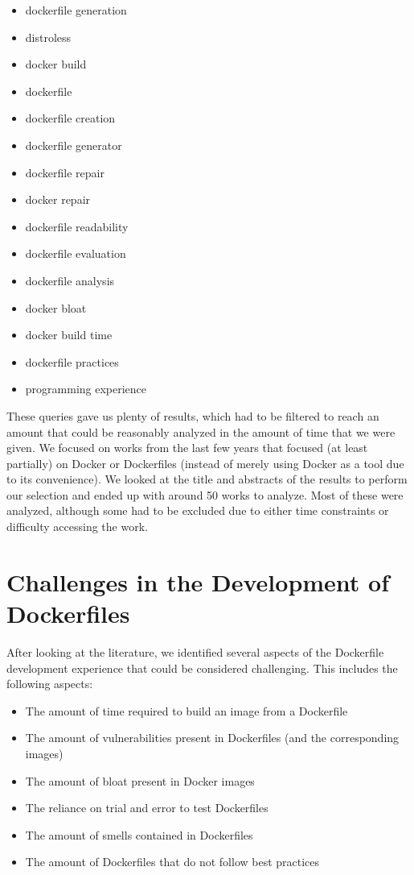 \begin{itemize}
    \item dockerfile generation
    \item distroless
    \item docker build
    \item dockerfile
    \item dockerfile creation
    \item dockerfile generator
    \item dockerfile repair
    \item docker repair
    \item dockerfile readability
    \item dockerfile evaluation
    \item dockerfile analysis
    \item docker bloat
    \item docker build time
    \item dockerfile practices
    \item programming experience
\end{itemize}

These queries gave us plenty of results, which had to be filtered to reach an amount that could be reasonably analyzed in the amount of time that we were given. We focused on works from the last few years that focused (at least partially) on Docker or Dockerfiles (instead of merely using Docker as a tool due to its convenience). We looked at the title and abstracts of the results to perform our selection and ended up with around 50 works to analyze. Most of these were analyzed, although some had to be excluded due to either time constraints or difficulty accessing the work. 

\section{Challenges in the Development of Dockerfiles} \label{sec:challenges_development_dockerfiles}

After looking at the literature, we identified several aspects of the Dockerfile development experience that could be considered challenging. This includes the following aspects:

\begin{itemize}
    \item The amount of time required to build an image from a Dockerfile
    \item The amount of vulnerabilities present in Dockerfiles (and the corresponding images)
    \item The amount of bloat present in Docker images
    \item The reliance on trial and error to test Dockerfiles
    \item The amount of smells contained in Dockerfiles
    \item The amount of Dockerfiles that do not follow best practices
\end{itemize}

